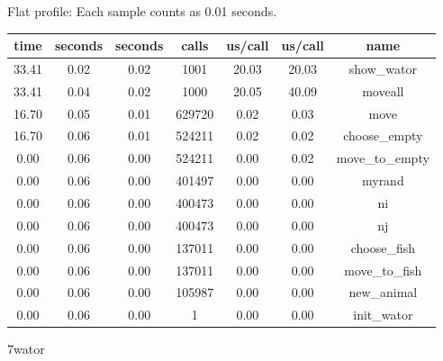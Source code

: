 \documentclass[a4paper,10pt]{article}
\begin{document}
Flat profile:
Each sample counts as 0.01 seconds.
\begin{center}
  \begin{tabular}{| c | c | c | c | c | c | c |}
    \hline
 time &   seconds &   seconds &    calls &  us/call &   us/call &   name \\ \hline    
 33.41 &      0.02 &     0.02 &     1001 &    20.03 &     20.03 &   show\_wator \\ \hline
 33.41 &      0.04 &     0.02 &     1000 &    20.05 &     40.09 &   moveall \\ \hline
 16.70 &      0.05 &     0.01 &   629720 &     0.02 &      0.03 &   move \\ \hline
 16.70 &      0.06 &     0.01 &   524211 &     0.02 &      0.02 &   choose\_empty \\ \hline
  0.00 &      0.06 &     0.00 &   524211 &     0.00 &      0.02 &   move\_to\_empty \\ \hline
  0.00 &      0.06 &     0.00 &   401497 &     0.00 &      0.00 &   myrand \\ \hline
  0.00 &      0.06 &     0.00 &   400473 &     0.00 &      0.00 &   ni \\ \hline
  0.00 &      0.06 &     0.00 &   400473 &     0.00 &      0.00 &   nj \\ \hline
  0.00 &      0.06 &     0.00 &   137011 &     0.00 &      0.00 &   choose\_fish \\ \hline
  0.00 &      0.06 &     0.00 &   137011 &     0.00 &      0.00 &   move\_to\_fish \\ \hline
  0.00 &      0.06 &     0.00 &   105987 &     0.00 &      0.00 &   new\_animal \\ \hline
  0.00 &      0.06 &     0.00 &        1 &     0.00 &      0.00 &   init\_wator \\ \hline
  \end{tabular}
\end{center}

7wator
\end{document}
